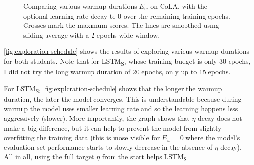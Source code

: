 \documentclass[bsc,frontabs,twoside,singlespacing,parskip,deptreport]{infthesis}
\def\LSTMS{LSTM\textsubscript{S}}
\def\sliding{The lines are smoothed using sliding average with a 2-epochs-wide window.}
\begin{document}
{{{      \begin{figure}[h!t]
        \centering
        \caption{Comparing various warmup durations $E_w$ on CoLA, with the optional learning rate decay to 0 over the remaining training epochs. Crosses mark the maximum scores. \sliding}
        \label{fig:exploration-schedule}
      \end{figure}

      \autoref{fig:exploration-schedule} shows the results of exploring various warmup durations for both students. Note that for \LSTMS, whose training budget is only 30 epochs, I did not try the long warmup duration of 20 epochs, only up to 15 epochs.

      For \LSTMS, \autoref{fig:exploration-schedule} shows that the longer the warmup duration, the later the model converges. This is understandable because during warmup the model uses smaller learning rate and so the learning happens less aggressively (slower). More importantly, the graph shows that $\eta$ decay does not make a big difference, but it can help to prevent the model from slightly overfitting the training data (this is mose visible for $E_w=0$ where the model's evaluation-set performance starts to slowly decrease in the absence of $\eta$ decay). All in all, using the full target $\eta$ from the start helps \LSTMS~

}}}
\end{document}
